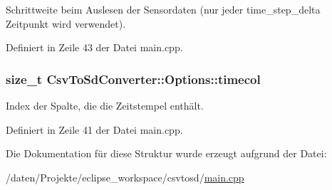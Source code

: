 Schrittweite beim Auslesen der Sensordaten (nur jeder time\-\_\-step\-\_\-delta Zeitpunkt wird verwendet). 



Definiert in Zeile 43 der Datei main.\-cpp.

\hypertarget{structCsvToSdConverter_1_1Options_a04caa5f640699fc38e1affe099c6d5eb}{
\subsubsection[{timecol}]{\setlength{\rightskip}{0pt plus 5cm}size\-\_\-t Csv\-To\-Sd\-Converter\-::\-Options\-::timecol}}\label{structCsvToSdConverter_1_1Options_a04caa5f640699fc38e1affe099c6d5eb}


Index der Spalte, die die Zeitstempel enthält. 



Definiert in Zeile 41 der Datei main.\-cpp.



Die Dokumentation für diese Struktur wurde erzeugt aufgrund der Datei\-:\begin{DoxyCompactItemize}
\item 
/daten/\-Projekte/eclipse\-\_\-workspace/csvtosd/\hyperlink{csvtosd_2main_8cpp}{main.\-cpp}\end{DoxyCompactItemize}
